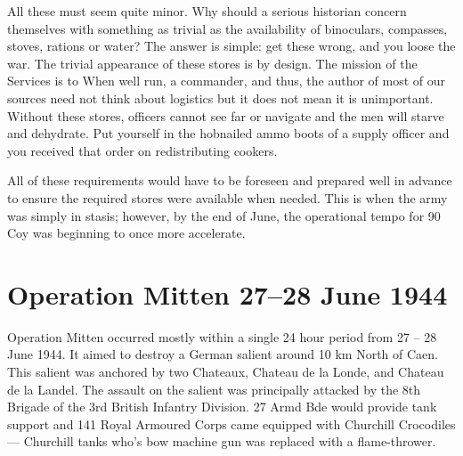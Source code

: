 \documentclass[noraggedright]{turabian-researchpaper}
\begin{document}
All these must seem quite minor.  Why should a serious historian concern 
themselves with something as trivial as the availability of binoculars, 
compasses, stoves, rations or water?  The answer is simple:  get these wrong, 
and you loose the war.  The trivial appearance of these stores is by design.  
The mission of the Services is to %
When well run, a commander, and thus, the author of most of our sources need
not think about logistics but it does not mean it is unimportant. Without
these stores, officers cannot see far or navigate and the men will starve and
dehydrate.  Put yourself in the hobnailed ammo boots of a supply officer and
you received that order on redistributing cookers.  

All of these requirements would have to be foreseen and 
prepared well in advance to ensure the required stores were available when
needed.  This is when the army was simply in stasis; however, by the end of
June, the operational tempo for 90 Coy was beginning to once more accelerate.

\section{Operation Mitten 27--28 June 1944}






Operation Mitten occurred mostly within a single 24 hour period from 27 -- 28
June 1944.  It aimed to destroy a German salient around 10 km North of Caen. 
This salient was anchored by two Chateaux, Chateau de la Londe, and Chateau de
la Landel.  The assault on the salient was principally attacked by the 8th 
Brigade of the 3rd British Infantry Division.  27 Armd Bde would provide
tank support and  141 Royal Armoured Corps came equipped with Churchill 
Crocodiles --- Churchill tanks who's bow machine gun was replaced with a 
flame-thrower.
\end{document}
